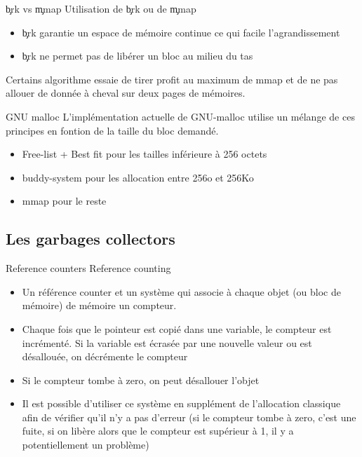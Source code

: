 \begin{frame}[fragile=singleslide]{\c{brk} vs \c{mmap}}
  Utilisation de \c{brk} ou de \c{mmap}
  \begin{itemize}
  \item \c{brk} garantie  un espace de mémoire continue  ce qui facile
    l'agrandissement
  \item \c{brk} ne permet pas de libérer un bloc au milieu du tas
  \end{itemize}
  Certains algorithme essaie de tirer  profit au maximum de mmap et de
  ne pas allouer de donnée à cheval sur deux pages de mémoires.
\end{frame}

\begin{frame}[fragile=singleslide]{GNU malloc}
  L'implémentation actuelle de  GNU-malloc utilise un mélange de
  ces principes en fontion de la taille du bloc demandé.
  \begin{itemize}
  \item Free-list + Best fit pour les tailles inférieure à 256 octets
  \item buddy-system pour les allocation entre 256o et 256Ko
  \item mmap pour le reste
  \end{itemize}
\end{frame}

\subsection{Les garbages collectors}

\begin{frame}[fragile=singleslide]{Reference counters}
 Reference counting
    \begin{itemize} 
    \item  Un référence  counter et  un système  qui associe  à chaque
      objet (ou bloc de mémoire) de mémoire un compteur.
    \item Chaque fois que le  pointeur est copié dans une variable, le
      compteur  est incrémenté.  Si la  variable est  écrasée  par une
      nouvelle valeur ou est désallouée, on décrémente le compteur
    \item Si le compteur tombe à zero, on peut désallouer l'objet
    \item  Il est  possible  d'utiliser ce  système  en supplément  de
      l'allocation classique afin de vérifier qu'il n'y a pas d'erreur
      (si  le compteur tombe  à zero,  c'est une  fuite, si  on libère
      alors que le compteur est  supérieur à 1, il y a potentiellement
      un problème)
    \end{itemize} 
  \end{frame}

